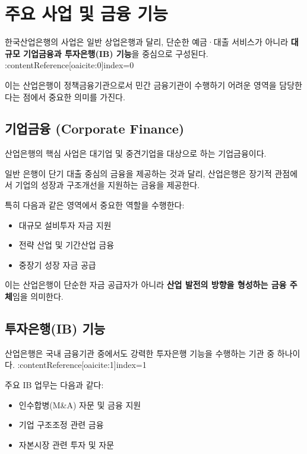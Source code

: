 \section{주요 사업 및 금융 기능}

한국산업은행의 사업은 일반 상업은행과 달리, 단순한 예금·대출 서비스가 아니라 \textbf{대규모 기업금융과 투자은행(IB) 기능}을 중심으로 구성된다. :contentReference[oaicite:0]{index=0}  

이는 산업은행이 정책금융기관으로서 민간 금융기관이 수행하기 어려운 영역을 담당한다는 점에서 중요한 의미를 가진다.

\subsection{기업금융 (Corporate Finance)}

산업은행의 핵심 사업은 대기업 및 중견기업을 대상으로 하는 기업금융이다.

일반 은행이 단기 대출 중심의 금융을 제공하는 것과 달리, 산업은행은 장기적 관점에서 기업의 성장과 구조개선을 지원하는 금융을 제공한다.

특히 다음과 같은 영역에서 중요한 역할을 수행한다:

\begin{itemize}
    \item 대규모 설비투자 자금 지원
    \item 전략 산업 및 기간산업 금융
    \item 중장기 성장 자금 공급
\end{itemize}

이는 산업은행이 단순한 자금 공급자가 아니라 \textbf{산업 발전의 방향을 형성하는 금융 주체}임을 의미한다.

\subsection{투자은행(IB) 기능}

산업은행은 국내 금융기관 중에서도 강력한 투자은행 기능을 수행하는 기관 중 하나이다. :contentReference[oaicite:1]{index=1}  

주요 IB 업무는 다음과 같다:

\begin{itemize}
    \item 인수합병(M\&A) 자문 및 금융 지원
    \item 기업 구조조정 관련 금융
    \item 자본시장 관련 투자 및 자문
\end{itemize}

